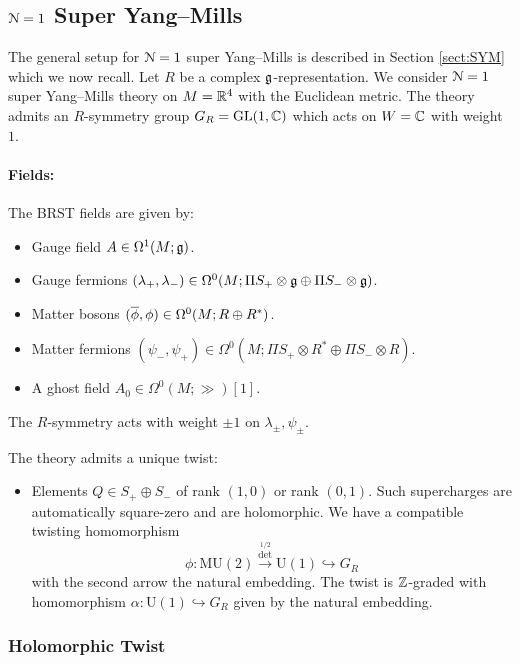 \documentclass[10pt, oneside]{article}
\newcommand{\MU}{\mathrm{MU}}
\renewcommand{\U}{\mathrm{U}}
\begin{document}
\subsection{\texorpdfstring{$\cN=1$}{N=1} Super Yang--Mills} \label{sect:4d_1_section}
The general setup for $\cN=1$ super Yang--Mills is described in Section \ref{sect:SYM} which we now recall.  Let $R$ be a complex $\fg$-representation. We consider $\cN=1$ super Yang--Mills theory on $M=\RR^4$ with the Euclidean metric. The theory admits an $R$-symmetry group $G_R=\GL(1, \CC)$ which acts on $W=\CC$ with weight $1$.

\vspace{-10pt}
\paragraph{Fields:} The BRST fields are given by:
\begin{itemize}
\item Gauge field $A \in \Omega^1(M; \fg)$.
\item Gauge fermions $(\lambda_+, \lambda_-) \in \Omega^0(M; \Pi S_+ \otimes \fg \oplus \Pi S_- \otimes \fg)$.
\item Matter bosons $(\Bar{\phi}, \phi) \in \Omega^0(M; R \oplus R^*)$.
\item Matter fermions $(\psi_-,\psi_+) \in \Omega^0(M; \Pi S_+ \otimes R^* \oplus \Pi S_- \otimes R)$.
\item A ghost field $A_0\in \Omega^0(M; \gg)[1]$.
\end{itemize}

The $R$-symmetry acts with weight $\pm 1$ on $\lambda_\pm, \psi_\pm$.

The theory admits a unique twist:
\begin{itemize}
\item Elements $Q\in S_+\oplus S_-$ of rank $(1, 0)$ or rank $(0, 1)$. Such supercharges are automatically square-zero and are holomorphic. 
We have a compatible twisting homomorphism 
\[
\phi\colon \MU(2)\xrightarrow{\det^{1/2}}\U(1)\hookrightarrow G_R 
\]
with the second arrow the natural embedding.
The twist is $\ZZ$-graded with homomorphism $\alpha \colon \U(1) \hookrightarrow G_R$ given by the natural embedding.
\end{itemize}

\subsubsection{Holomorphic Twist}
\label{sect:4d1holomorphictwist}
\end{document}
